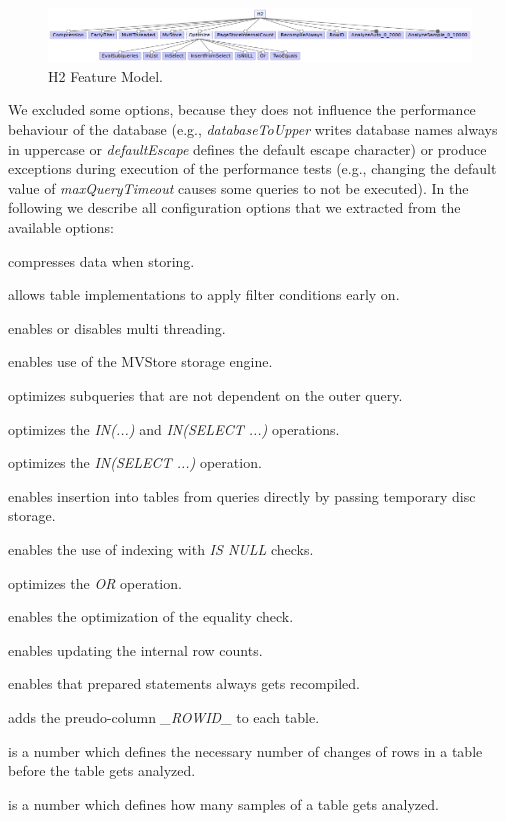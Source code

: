 \begin{figure}
  \centering
  \includegraphics[width=\textwidth]{images/H2_Feature_model}
  \caption{H2 Feature Model.}
  \label{fm_h2}
\end{figure}


We excluded some options, because they does not influence the performance behaviour of the database (e.g., \textit{databaseToUpper} writes database names always in uppercase or \textit{defaultEscape} defines the default escape character) or produce exceptions during execution of the performance tests (e.g., changing the default value of \textit{maxQueryTimeout} causes some queries to not be executed). In the following we describe all configuration options that we extracted from the available options:

\begin{description}[style=multiline,leftmargin=11em]
	\item [Compression] compresses data when storing.
	\item [EarlyFilter] allows table implementations to apply filter conditions early on.
	\item [MultiThreaded] enables or disables multi threading.
	\item [MvStore] enables use of the MVStore storage engine.
	\item [OptimizeEvalSubqueries] optimizes subqueries that are not dependent on the outer query.
	\item [OptimizeInList] optimizes the \textit{IN(...)} and \textit{IN(SELECT ...)} operations.
	\item [OptimizeInSelect] optimizes the \textit{IN(SELECT ...)} operation.
	\item [OptimizeInsertFromSelect] enables insertion into tables from queries directly by passing temporary disc storage.
	\item [OptimizeIsNull] enables the use of indexing with \textit{IS NULL} checks.
	\item [OptimizeOr] optimizes the \textit{OR} operation.
	\item [OptimizeTwoEquals] enables the optimization of the equality check.
	\item [PageStoreInternalCount] enables updating the internal row counts.
	\item [RecompileAlways] enables that prepared statements always gets recompiled.
	\item [RowID] adds the preudo-column \textit{\_ROWID\_} to each table.
	\item [AnalyzeAuto] is a number which defines the necessary number of changes of rows in a table before the table gets analyzed.
	\item [AnalyzeSample] is a number which defines how many samples of a table gets analyzed.
\end{description}


